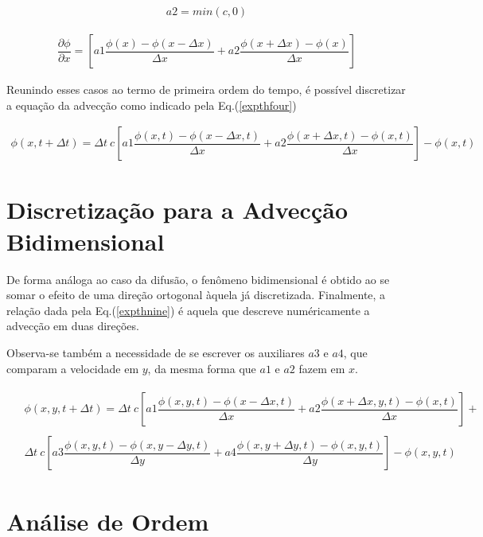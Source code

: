 \begin{align}
\label{expthtwo}
a2 = min (c,0)
\end{align}
	
\begin{align}
\label{expththree}
\dfrac{\partial \phi}{\partial x} = \left[a1 \dfrac{\phi(x)-\phi(x-\Delta x)}{\Delta x} + a2 \dfrac{\phi(x + \Delta x)-\phi(x)}{\Delta x} \right]
\end{align}	
	
	Reunindo esses casos ao termo de primeira ordem do tempo, é possível discretizar a equação da advecção como indicado pela Eq.(\ref{expthfour})
	
\begin{align}
\label{expthfour}
\phi(x,t+\Delta t) = \Delta t \ c \left[a1 \dfrac{\phi(x,t)-\phi(x-\Delta x,t)}{\Delta x} + a2 \dfrac{\phi(x + \Delta x,t)-\phi(x,t)}{\Delta x} \right] - \phi(x,t) 
\end{align}

\newpage

\section{Discretização para a Advecção Bidimensional}

\noindent

	De forma análoga ao caso da difusão, o fenômeno bidimensional é obtido ao se somar o efeito de uma direção ortogonal àquela já discretizada. Finalmente, a relação dada pela Eq.(\ref{expthnine}) é aquela que descreve numéricamente a advecção em duas direções.
	
	Observa-se também a necessidade de se escrever os auxiliares $a3$ e $a4$, que comparam a velocidade em $y$, da mesma forma que $a1$ e $a2$ fazem em $x$.
	
\begin{align}
\label{expthnine}
\begin{array}{cc}
&\phi(x,y,t+\Delta t) = \Delta t \ c \left[a1 \dfrac{\phi(x,y,t)-\phi(x-\Delta x,t)}{\Delta x} + a2 \dfrac{\phi(x + \Delta x,y,t)-\phi(x,t)}{\Delta x}\right] + \\
&\\
&\Delta t \ c  \left[a3 \dfrac{\phi(x,y,t)-\phi(x,y-\Delta y,t)}{\Delta y} + a4 \dfrac{\phi(x,y+\Delta y,t)-\phi(x,y,t)}{\Delta y} \right] - \phi(x,y,t) 
\end{array}
\end{align}


\section{Análise de Ordem}

